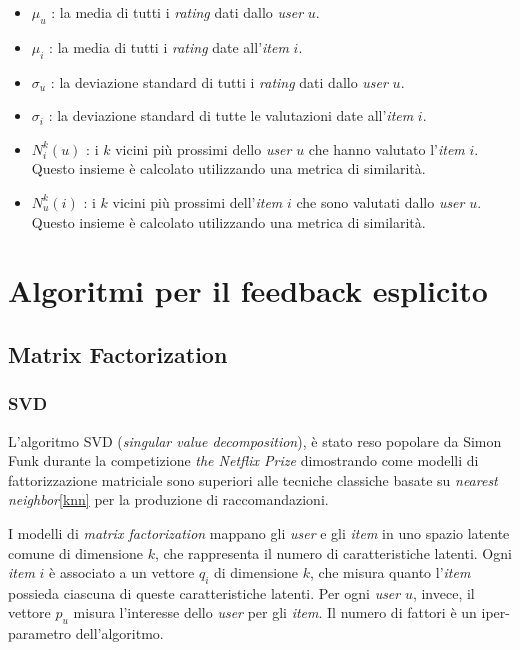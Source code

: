\begin{itemize}
    \item $\mu_u$ : la media di tutti i \textit{rating} dati dallo \textit{user} $u$.
    \item $\mu_i$ : la media di tutti i \textit{rating} date all'\textit{item} $i$.
    \item $\sigma_u$ : la deviazione standard di tutti i \textit{rating} dati dallo \textit{user} $u$.
    \item $\sigma_i$ : la deviazione standard di tutte le valutazioni date all'\textit{item} $i$.
    \item $N_i^k(u)$ : i $k$ vicini più prossimi dello \textit{user} $u$ che hanno valutato l'\textit{item} $i$. Questo insieme è calcolato utilizzando una metrica di similarità.
    \item $N_u^k(i)$ : i $k$ vicini più prossimi dell'\textit{item} $i$ che sono valutati dallo \textit{user} $u$. Questo insieme è calcolato utilizzando una metrica di similarità.
\end{itemize}

\section{Algoritmi per il feedback esplicito}\label{algoritmi-per-feedback-esplicito}

\subsection{Matrix Factorization}

\subsubsection{SVD}

L'algoritmo SVD (\textit{singular value decomposition}), è stato reso popolare da Simon Funk durante la competizione \textit{the Netflix Prize} dimostrando come modelli di fattorizzazione matriciale sono superiori alle tecniche classiche basate su \textit{nearest neighbor}\ref{knn} per
la produzione di raccomandazioni.

I modelli di \textit{matrix factorization} mappano gli \textit{user} e gli \textit{item} in uno spazio latente comune di dimensione $k$, che rappresenta il numero di caratteristiche latenti. Ogni \textit{item} $i$ è associato a un vettore $q_i$ di dimensione $k$, che misura quanto l'\textit{item} possieda ciascuna di queste caratteristiche latenti. Per ogni \textit{user} $u$, invece, il vettore $p_u$ misura l'interesse dello \textit{user} per gli \textit{item}. Il numero di fattori è un iper-parametro dell'algoritmo.

